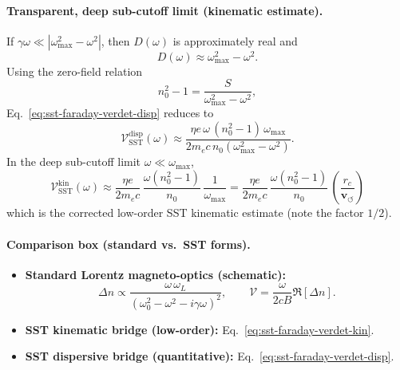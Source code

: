 \documentclass[10pt]{article}
\newcommand{\vswirl}{\mathbf{v}_{\!\boldsymbol{\circlearrowleft}}}
\newcommand{\rc}{r_c}                                    %
\begin{document}
        \paragraph{Transparent, deep sub-cutoff limit (kinematic estimate).}
            If \(\gamma\omega\ll \left|\omega_{\max}^2-\omega^2\right|\), then \(D(\omega)\) is approximately real and
            \[
                D(\omega)\approx \omega_{\max}^2-\omega^2.
            \]
            Using the zero-field relation
            \begin{equation}
                n_0^2-1=\frac{S}{\omega_{\max}^2-\omega^2},
                \label{eq:sst-faraday-zero-field-index}
            \end{equation}
            Eq.~\eqref{eq:sst-faraday-verdet-disp} reduces to
            \begin{equation}
                \mathcal{V}_{\mathrm{SST}}^{\mathrm{disp}}(\omega)
                \approx
                \frac{\eta e\,\omega\,(n_0^2-1)\,\omega_{\max}}
                {2m_e c\,n_0\left(\omega_{\max}^2-\omega^2\right)}.
                \label{eq:sst-faraday-verdet-subcutoff}
            \end{equation}
            In the deep sub-cutoff limit \(\omega\ll \omega_{\max}\),
            \begin{equation}
                \boxed{
                    \mathcal{V}_{\mathrm{SST}}^{\mathrm{kin}}(\omega)
                    \approx
                    \frac{\eta e}{2m_e c}\,
                    \frac{\omega(n_0^2-1)}{n_0}\,
                    \frac{1}{\omega_{\max}}
                    =
                    \frac{\eta e}{2m_e c}\,
                    \frac{\omega(n_0^2-1)}{n_0}\,
                    \left(\frac{\rc}{\vswirl}\right)
                }
                \label{eq:sst-faraday-verdet-kin}
            \end{equation}
            which is the corrected low-order SST kinematic estimate (note the factor \(1/2\)).

        \paragraph{Comparison box (standard vs.\ SST forms).}
            \begin{itemize}
                \item \textbf{Standard Lorentz magneto-optics (schematic):}
                \[
                    \Delta n \propto \frac{\omega\,\omega_L}{\left(\omega_0^2-\omega^2-i\gamma\omega\right)^2},
                    \qquad
                    \mathcal{V}=\frac{\omega}{2cB}\Re[\Delta n].
                \]
                \item \textbf{SST kinematic bridge (low-order):} Eq.~\eqref{eq:sst-faraday-verdet-kin}.
                \item \textbf{SST dispersive bridge (quantitative):} Eq.~\eqref{eq:sst-faraday-verdet-disp}.
            \end{itemize}
\end{document}
